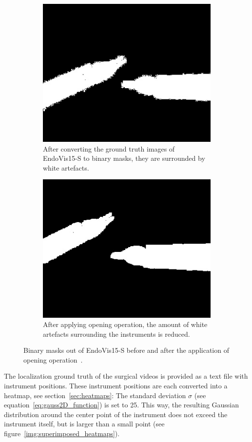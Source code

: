 \begin{figure}
\centering
\begin{subfigure}[t]{0.49\textwidth}
	\centering
	\includegraphics[width=.65\textwidth]{images/dataset/robotic15_segm/white_artefacts_dataset1_frame21.jpg}
	\caption{After converting the ground truth images of EndoVis15-S to binary masks, they are surrounded by white artefacts.}
	\label{img:white_artefacts_endovis15}
\end{subfigure}
\begin{subfigure}[t]{0.49\textwidth}
	\centering
	\includegraphics[width=.65\textwidth]{images/dataset/robotic15_segm/mask_after_morph_dataset1_frame21.jpg}
	\caption{After applying opening operation, the amount of white artefacts surrounding the instruments is reduced.}
	\label{img:mask_endovis15_after_morphology}
\end{subfigure}
\caption[Application opening operation on binary masks]{Binary masks out of EndoVis15-S before and after the application of opening operation~\cite{opening1987haralick}.}
\label{img:unprocessed_processed_masks_endovis15}
\end{figure}

The localization ground truth of the surgical videos is provided as a text file with instrument positions. These instrument positions are each converted into a heatmap, see section~\ref{sec:heatmaps}:
The standard deviation $\sigma$ (see equation~\ref{eq:gauss2D_function}) is set to 25. This way, the resulting Gaussian distribution around the center point of the instrument does not exceed the instrument itself, but is larger than a small point (see figure~\ref{img:superimposed_heatmaps}).

